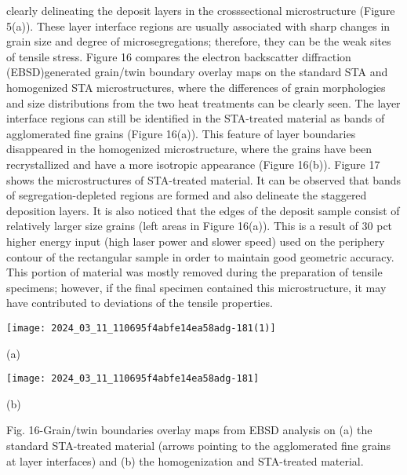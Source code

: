 \documentclass[10pt]{article}
\begin{document}
clearly delineating the deposit layers in the crosssectional microstructure (Figure 5(a)). These layer interface regions are usually associated with sharp changes in grain size and degree of microsegregations; therefore, they can be the weak sites of tensile stress. Figure 16 compares the electron backscatter diffraction (EBSD)generated grain/twin boundary overlay maps on the standard STA and homogenized STA microstructures, where the differences of grain morphologies and size distributions from the two heat treatments can be clearly seen. The layer interface regions can still be identified in the STA-treated material as bands of agglomerated fine grains (Figure 16(a)). This feature of layer boundaries disappeared in the homogenized microstructure, where the grains have been recrystallized and have a more isotropic appearance (Figure 16(b)). Figure 17 shows the microstructures of STA-treated material. It can be observed that bands of segregation-depleted regions are formed and also delineate the staggered deposition layers. It is also noticed that the edges of the deposit sample consist of relatively larger size grains (left areas in Figure 16(a)). This is a result of 30 pct higher energy input (high laser power and slower speed) used on the periphery contour of the rectangular sample in order to maintain good geometric accuracy. This portion of material was mostly removed during the preparation of tensile specimens; however, if the final specimen contained this microstructure, it may have contributed to deviations of the tensile properties.

\begin{center}
\texttt{[image: 2024\_03\_11\_110695f4abfe14ea58adg-181(1)]}
\end{center}

(a)

\begin{center}
\texttt{[image: 2024\_03\_11\_110695f4abfe14ea58adg-181]}
\end{center}

(b)

Fig. 16-Grain/twin boundaries overlay maps from EBSD analysis on (a) the standard STA-treated material (arrows pointing to the agglomerated fine grains at layer interfaces) and (b) the homogenization and STA-treated material.
\end{document}
